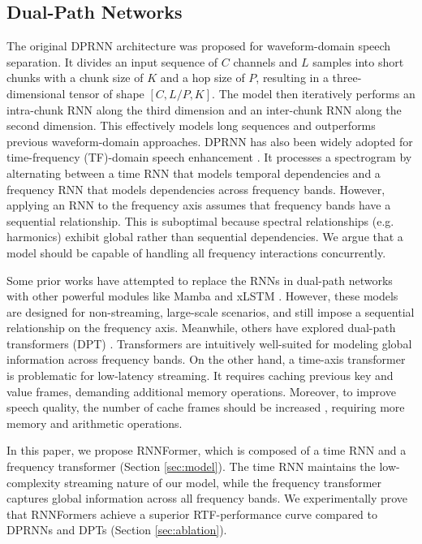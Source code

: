 
\subsection{Dual-Path Networks}
\label{sec:related-dpn}
The original DPRNN \cite{dprnn} architecture was proposed for waveform-domain speech separation. It divides an input sequence of $C$ channels and $L$ samples into short chunks with a chunk size of $K$ and a hop size of $P$, resulting in a three-dimensional tensor of shape $[C, L/P, K]$. The model then iteratively performs an intra-chunk RNN along the third dimension and an inter-chunk RNN along the second dimension. This effectively models long sequences and outperforms previous waveform-domain approaches. DPRNN has also been widely adopted for time-frequency (TF)-domain speech enhancement \cite{dpcrn, trunet, fspen, gtcrn, lisennet, bsrnn-se}. It processes a spectrogram by alternating between a time RNN that models temporal dependencies and a frequency RNN that models dependencies across frequency bands. However, applying an RNN to the frequency axis assumes that frequency bands have a sequential relationship. This is suboptimal because spectral relationships (e.g. harmonics) exhibit global rather than sequential dependencies. We argue that a model should be capable of handling all frequency interactions concurrently.

Some prior works have attempted to replace the RNNs in dual-path networks with other powerful modules like Mamba and xLSTM \cite{semamba, xlstm-senet}. However, these models are designed for non-streaming, large-scale scenarios, and still impose a sequential relationship on the frequency axis. Meanwhile, others have explored dual-path transformers (DPT) \cite{dptnet, sepformer}. Transformers are intuitively well-suited for modeling global information across frequency bands. On the other hand, a time-axis transformer is problematic for low-latency streaming. It requires caching previous key and value frames, demanding additional memory operations. Moreover, to improve speech quality, the number of cache frames should be increased \cite{streaming-dpt}, requiring more memory and arithmetic operations.

In this paper, we propose RNNFormer, which is composed of a time RNN and a frequency transformer (Section \ref{sec:model}). The time RNN maintains the low-complexity streaming nature of our model, while the frequency transformer captures global information across all frequency bands. We experimentally prove that RNNFormers achieve a superior RTF-performance curve compared to DPRNNs and DPTs (Section \ref{sec:ablation}).


